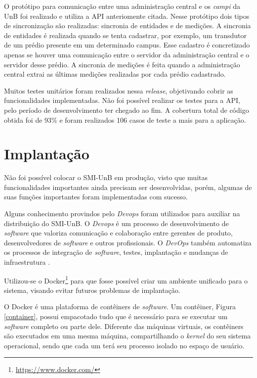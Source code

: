 O protótipo para comunicação entre uma administração central e os \textit{campi} da UnB foi realizado e utiliza a API anteriomente citada. Nesse protótipo dois tipos de sincronização são realizadas: sincronia de entidades e de medições. A sincronia de entidades é realizada quando se tenta cadastrar, por exemplo, um transdutor de um prédio presente em um determinado campus. Esse cadastro é concretizado apenas se houver uma comunicação entre o servidor da administração central e o servidor desse prédio. A sincronia de medições é feita quando a administração central extrai as últimas medições realizadas por cada prédio cadastrado.

Muitos testes unitários foram realizados nessa \textit{release}, objetivando cobrir as funcionalidades implementadas. Não foi possível realizar os testes para a API, pelo período de desenvolvimento ter chegado ao fim. A cobertura total de código obtida foi de 93\% e foram realizados 106 casos de teste a mais para a aplicação.

\section{Implantação}
Não foi possível colocar o SMI-UnB em produção, visto que muitas funcionalidades importantes ainda precisam ser desenvolvidas, porém, algumas de suas funções importantes foram implementadas com sucesso.

Alguns conhecimento provindos pelo \textit{Devops} foram utilizados para auxiliar na distribuição do SMI-UnB. O \textit{Devops} é um processo de desenvolvimento de \textit{software} que valoriza comunicação e colaboração entre gerentes de produto, desenvolvedores de \textit{software} e outros profissionais. O \textit{DevOps} também automatiza os processos de integração de \textit{software}, testes, implantação e mudanças de infraestrutura \cite{loukides_2012}.

Utilizou-se o Docker\footnote{\url{https://www.docker.com/}} para que fosse possível criar um ambiente unificado para o sistema, visando evitar futuros problemas de implantação.

O Docker é uma plataforma de contêiners de \textit{software}. Um contêiner, Figura \ref{container}, possui empacotado tudo que é necessário para se executar um \textit{software} completo ou parte dele. Diferente das máquinas virtuais, os contêiners são executados em uma mesma máquina, compartilhando o \textit{kernel} do seu sistema operacional, sendo que cada um terá seu processo isolado no espaço de usuário.

